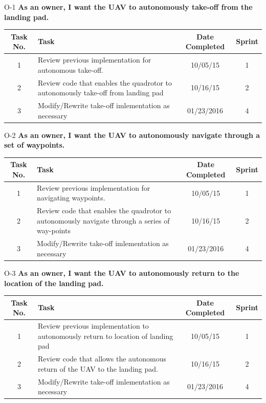 \documentclass[11pt]{beamer}
\begin{document}
\begin{frame}{O-1}
\textbf{As an owner, I want the UAV to autonomously take-off from the landing pad.}
\begin{tabular}{| c | >{\raggedright}m{4cm} | c | c |}\hline
Task No. & Task & Date Completed & Sprint\\\hline
1 & Review previous implementation for autonomous take-off. & 10/05/15 & 1 \\\hline
2 & Review code that enables the quadrotor to autonomously take-off from landing pad & 10/16/15 & 2 \\\hline
3 & Modify/Rewrite take-off imlementation as necessary & 01/23/2016 & 4 \\\hline
\end{tabular}
\end{frame}


\begin{frame}{O-2}
\textbf{As an owner, I want the UAV to autonomously navigate through a set of waypoints.}
\begin{tabular}{| c | >{\raggedright}m{4cm} | c | c |}\hline
Task No. & Task & Date Completed & Sprint\\\hline
1 & Review previous implementation for navigating waypoints. & 10/05/15 & 1 \\\hline
2 & Review code that enables the quadrotor to autonomously navigate through a series of way-points & 10/16/15 & 2 \\\hline
3 & Modify/Rewrite take-off imlementation as necessary & 01/23/2016 & 4 \\\hline
\end{tabular}
\end{frame}


\begin{frame}{O-3}
\textbf{As an owner, I want the UAV to autonomously return to the location of the landing pad.}
\begin{tabular}{| c | >{\raggedright}m{4cm} | c | c |}\hline
Task No. & Task & Date Completed & Sprint\\\hline
1 & Review previous implementation to autonomously return to location of landing pad & 10/05/15 & 1 \\\hline
2 & Review code that allows the autonomous return of the UAV to the landing pad. & 10/16/15 & 2 \\\hline
3 & Modify/Rewrite take-off imlementation as necessary & 01/23/2016 & 4 \\\hline
\end{tabular}
\end{frame}
\end{document}
